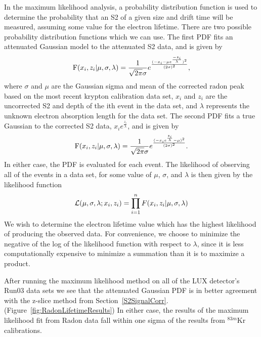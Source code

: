 In the maximum likelihood analysis, a probability distribution function is used to determine the probability that an S2 of a given size and drift time will be measured, assuming some value for the electron lifetime.  There are two possible probability distribution functions which we can use.  The first PDF fits an attenuated Gaussian model to the attenuated S2 data, and is given by
\begin{equation}
\mbox{F}(x_i, z_i \text{\textbar} \mu, \sigma, \lambda) = \frac{1}{\sqrt{2\pi}\sigma} e^\frac{(-x_i - \mu e^\frac{-z_i}{\lambda})^2}{(2\sigma)^2}, 
\end{equation}
where $\sigma$ and $\mu$ are the Gaussian sigma and mean of the corrected radon peak based on the most recent krypton calibration data set, $x_i$ and $z_i$ are the uncorrected S2 and depth of the ith event in the data set, and $\lambda$ represents the unknown electron absorption length for the data set.  The second PDF fits a true Gaussian to the corrected S2 data, $x_i e^\frac{z_i}{\lambda}$, and is given by
\begin{equation}
\mbox{F}(x_i, z_i \text{\textbar} \mu, \sigma, \lambda) = \frac{1}{\sqrt{2 \pi} \sigma} e^\frac{(-x_i e^\frac{z_i}{\lambda} - \mu)^2}{(2 \sigma)^2}. 
\end{equation}
In either case, the PDF is evaluated for each event.  The likelihood of observing all of the events in a data set, for some value of $\mu$, $\sigma$, and $\lambda$ is then given by the likelihood function
\begin{equation}
\mathcal{L}(\mu, \sigma, \lambda ; x_i, z_i) = \prod_{i=1}^{n} F(x_i, z_i \text{\textbar} \mu, \sigma, \lambda)
\end{equation}
We wish to determine the electron lifetime value which has the highest likelihood of producing the observed data.  For convenience, we choose to minimize the negative of the log of the likelihood function with respect to $\lambda$, since it is less computationally expensive to minimize a summation than it is to maximize a product.  

After running the maximum likelihood method on all of the LUX detector's Run03 data sets we see that the attenuated Gaussian PDF is in better agreement with the z-slice method from Section~\ref{S2SignalCorr}. (Figure~\ref{fig:RadonLifetimeResults}) In either case, the results of the maximum likelihood fit from Radon data fall within one sigma of the results from $^{83m}$Kr calibrations. 

